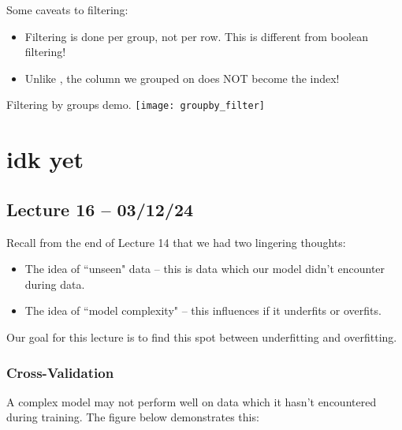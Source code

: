 \documentclass[openany]{book}
\begin{document}
\begin{warn}
	Some caveats to filtering:
	\begin{itemize}
		\item Filtering is done per group, not per row. This is different from boolean filtering!
		\item Unlike , the column we grouped on does NOT become the index!
	\end{itemize}
\end{warn}

\begin{figurebox}[]{Filtering by groups demo.}
	\centering\texttt{[image: groupby\_filter]}
\end{figurebox}

\chapter{idk yet}
\section{Lecture 16 -- 03/12/24}
Recall from the end of Lecture 14 that we had two lingering thoughts:
\begin{itemize}
	\item The idea of ``unseen" data -- this is data which our model didn't encounter during data.
	\item The idea of ``model complexity" -- this influences if it underfits or overfits.
\end{itemize}

\begin{comment}
\begin{figurebox}[]{Model Complexity versus Error/Variance}
	\centering\texttt{[image: model\_graph]}
\end{figurebox}
\end{comment}

Our goal for this lecture is to find this spot between underfitting and overfitting.
\subsection{Cross-Validation}
A complex model may not perform well on data which it hasn't encountered during training. The figure below demonstrates this:

\begin{comment}
	\begin{figurebox}[]{Complex model on unseen data}
		\centering\texttt{[image: complex\_on\_unseen]}
	\end{figurebox}
\end{comment}
\end{document}
